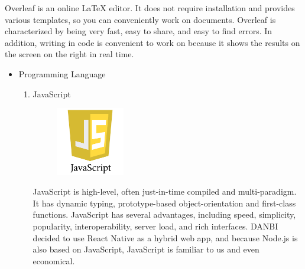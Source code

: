 \documentclass[conference]{IEEEtran}
\begin{document}
\begin{itemize}
\begin{enumerate}
Overleaf is an online LaTeX editor. It does not require installation and provides various templates, so you can conveniently work on documents. Overleaf is characterized by being very fast, easy to share, and easy to find errors. In addition, writing in code is convenient to work on because it shows the results on the screen on the right in real time.

\end{enumerate}
\end{itemize}
\vspace{0.5mm}
\begin{itemize}
\item Programming Language
\setlength{\parindent}{2ex}

\begin{enumerate}
\item JavaScript
\par \begin{figure}[h!]
\includegraphics[width=3cm]{image/JavaScript.png}
\centering
\end{figure}
\setlength{\parindent}{2ex}
\setlength{\parskip}{0.5em}
JavaScript is high-level, often just-in-time compiled and multi-paradigm. It has dynamic typing, prototype-based object-orientation and first-class functions. JavaScript has several advantages, including speed, simplicity, popularity, interoperability, server load, and rich interfaces. DANBI decided to use React Native as a hybrid web app, and because Node.js is also based on JavaScript, JavaScript is familiar to us and even economical.
\end{enumerate}
\end{itemize}
\vspace{0.5mm}
\end{document}
